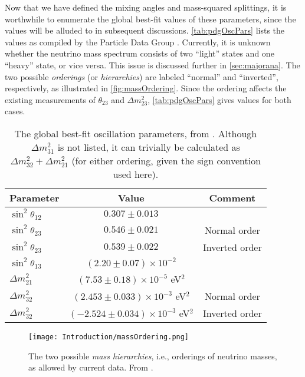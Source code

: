 \documentclass[../thesis.tex]{subfiles}
\begin{document}
Now that we have defined the mixing angles and mass-squared splittings, it is worthwhile to enumerate the global best-fit values of these parameters, since the values will be alluded to in subsequent discussions. \autoref{tab:pdgOscPars} lists the values as compiled by the Particle Data Group \cite{PDG}. Currently, it is unknown whether the neutrino mass spectrum consists of two ``light'' states and one ``heavy'' state, or vice versa. This issue is discussed further in \autoref{sec:majorana}. The two possible \emph{orderings} (or \emph{hierarchies}) are labeled ``normal'' and ``inverted'', respectively, as illustrated in \autoref{fig:massOrdering}. Since the ordering affects the existing measurements of $\theta_{23}$ and $\Delta m^2_{23}$, \autoref{tab:pdgOscPars} gives values for both cases.

\begin{table}[h]
  \begin{tabular}{lcc}
    \toprule
    Parameter & Value & Comment \\
    \midrule
    $\sin^2 \theta_{12}$ & $0.307 \pm 0.013$ & \\
    $\sin^2 \theta_{23}$ & $0.546 \pm 0.021$ & Normal order \\
    $\sin^2 \theta_{23}$ & $0.539 \pm 0.022$ & Inverted order \\
    $\sin^2 \theta_{13}$ & $(2.20 \pm 0.07) \times 10^{-2}$ & \\
    \midrule
    $\Delta m^2_{21}$ & $(7.53 \pm 0.18) \times 10^{-5}$ eV$^2$ & \\
    $\Delta m^2_{32}$ & $(2.453 \pm 0.033) \times 10^{-3}$ eV$^2$ & Normal order \\
    $\Delta m^2_{32}$ & $(-2.524 \pm 0.034) \times 10^{-3}$ eV$^2$ & Inverted order \\
    \bottomrule
  \end{tabular}
  \caption{The global best-fit oscillation parameters, from \cite{PDG}. Although $\Delta m^2_{31}$ is not listed, it can trivially be calculated as $\Delta m^2_{32} + \Delta m^2_{21}$ (for either ordering, given the sign convention used here).}
  \label{tab:pdgOscPars}
\end{table}

\begin{figure}[h]
  \texttt{[image: Introduction/massOrdering.png]}
  \caption{The two possible \emph{mass hierarchies}, i.e., orderings of neutrino masses, as allowed by current data. From \cite{NuPhysWithJUNO}.}
  \label{fig:massOrdering}
\end{figure}
\end{document}
